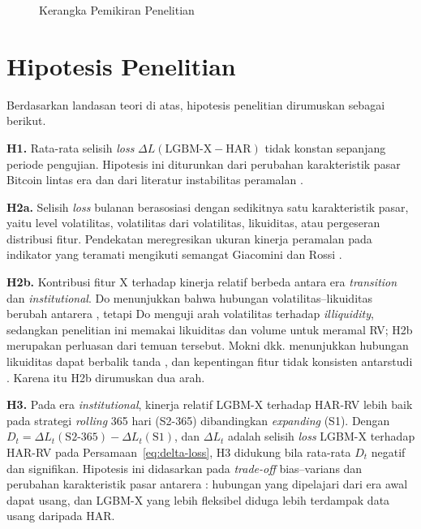 \begin{figure}[htbp]
  \caption{Kerangka Pemikiran Penelitian}
  \label{fig:kerangka}
\end{figure}

\section{Hipotesis Penelitian}
\label{sec:hipotesis}
Berdasarkan landasan teori di atas, hipotesis penelitian dirumuskan sebagai
berikut.

\textbf{H1.} Rata-rata selisih \textit{loss}
$\Delta L(\text{LGBM-X} - \text{HAR})$ tidak konstan sepanjang periode
pengujian. Hipotesis ini diturunkan dari perubahan karakteristik pasar Bitcoin
lintas era \cite{do2026,mokni2024} dan dari literatur instabilitas peramalan
\cite{rossi2013,martins2016}.

\textbf{H2a.} Selisih \textit{loss} bulanan berasosiasi dengan sedikitnya satu
karakteristik pasar, yaitu level volatilitas, volatilitas dari volatilitas,
likuiditas, atau pergeseran distribusi fitur. Pendekatan meregresikan ukuran
kinerja peramalan pada indikator yang teramati mengikuti semangat Giacomini dan
Rossi \cite{giacomini2009}.

\textbf{H2b.} Kontribusi fitur X terhadap kinerja relatif berbeda antara era
\textit{transition} dan \textit{institutional}. Do menunjukkan bahwa hubungan
volatilitas--likuiditas berubah antarera \cite{do2026}, tetapi Do menguji arah
volatilitas terhadap \textit{illiquidity}, sedangkan penelitian ini memakai
likuiditas dan volume untuk meramal RV; H2b merupakan perluasan dari temuan
tersebut. Mokni dkk. menunjukkan hubungan likuiditas dapat berbalik tanda
\cite{mokni2024}, dan kepentingan fitur tidak konsisten antarstudi
\cite{wang2023,feng2024ml}. Karena itu H2b dirumuskan dua arah.

\textbf{H3.} Pada era \textit{institutional}, kinerja relatif LGBM-X terhadap
HAR-RV lebih baik pada strategi \textit{rolling} 365 hari (S2-365)
dibandingkan \textit{expanding} (S1). Dengan
$D_t = \Delta L_t(\text{S2-365}) - \Delta L_t(\text{S1})$, dan $\Delta L_t$
adalah selisih \textit{loss} LGBM-X terhadap HAR-RV pada
Persamaan~\ref{eq:delta-loss}, H3 didukung bila rata-rata $D_t$ negatif dan
signifikan. Hipotesis ini
didasarkan pada \textit{trade-off} bias--varians \cite{pesaran2007,rossi2013}
dan perubahan karakteristik pasar antarera \cite{do2026}: hubungan yang
dipelajari dari era awal dapat usang, dan LGBM-X yang lebih fleksibel diduga
lebih terdampak data usang daripada HAR.

